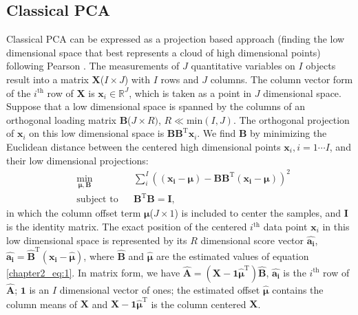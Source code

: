 \subsection{Classical PCA}
Classical PCA can be expressed as a projection based approach (finding the low dimensional space that best represents a cloud of high dimensional points) following Pearson \cite{pearson1901lines}. The measurements of $J$ quantitative variables on $I$ objects result into a matrix $\mathbf{X}$($I \times J$) with $I$ rows and $J$ columns. The column vector form of the $i^{\text{th}}$ row of $\mathbf{X}$ is $\mathbf{x}_i \in \mathbb{R}^J$, which is taken as a point in $J$ dimensional space. Suppose that a low dimensional space is spanned by the columns of an orthogonal loading matrix $\mathbf{B}$($J \times R)$, $R \ll \text{min}(I,J)$. The orthogonal projection of $\mathbf{x}_i$ on this low dimensional space is $\mathbf{B}\mathbf{B}^{\text{T}}\mathbf{x}_i$. We find $\mathbf{B}$ by minimizing the Euclidean distance between the centered high dimensional points $\mathbf{x}_i, i=1\cdots I$, and their low dimensional projections:
\begin{equation}\label{chapter2_eq:1}
\begin{aligned}
& \underset{\bm{\mu},\mathbf{B}}{\text{min}}
& &\sum_{i}^{I}((\mathbf{x_i} - \bm{\mu}) - \mathbf{BB}^{\text{T}}(\mathbf{x_i} - \bm{\mu}))^{2}\\
& \text{subject to}
& &\mathbf{B}^{\text{T}}\mathbf{B} = \mathbf{I},
\end{aligned}
\end{equation}
in which the column offset term $\bm{\mu}$($J \times 1$) is included to center the samples, and $\mathbf{I}$ is the identity matrix. The exact position of the centered $i^{\text{th}}$ data point $\mathbf{x}_i$ in this low dimensional space is represented by its $R$ dimensional score vector $\hat{\mathbf{a_i}}$, $\hat{\mathbf{a_{i}}} = \hat{\mathbf{B}}^{\text{T}}( \mathbf{x_i} - \hat{\bm{\mu}})$, where $\hat{\mathbf{B}}$ and $\hat{\bm{\mu}}$ are the estimated values of equation \ref{chapter2_eq:1}. In matrix form, we have $\hat{\mathbf{A}}=(\mathbf{X} - \mathbf{1}\hat{\bm{\mu}}^{\text{T}})\hat{\mathbf{B}}$, $\hat{\mathbf{a_i}}$ is the $i^{\text{th}}$ row of $\hat{\mathbf{A}}$; $\mathbf{1}$ is an $I$ dimensional vector of ones; the estimated offset $\hat{\bm{\mu}}$ contains the column means of $\mathbf{X}$ and $\mathbf{X} - \mathbf{1}\hat{\bm{\mu}}^{\text{T}}$ is the column centered $\mathbf{X}$.

